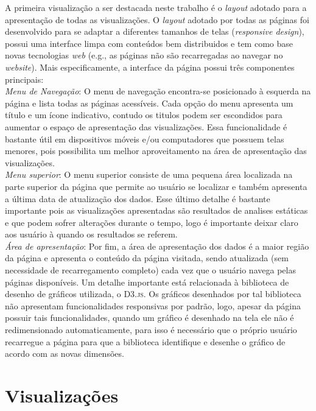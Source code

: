 \documentclass[12pt]{article}
\begin{document}
A primeira visualização a ser destacada neste trabalho é o \textit{layout} adotado para a apresentação de todas as visualizações. O \textit{layout} adotado por todas as páginas foi desenvolvido para se adaptar a diferentes tamanhos de telas (\textit{responsive design}), possui uma interface limpa com conteúdos bem distribuidos e tem como base novas tecnologias \textit{web} (e.g., as páginas não são recarregadas ao navegar no \textit{website}). Mais especificamente, a interface da página possui três componentes principais: \\


\noindent \emph{Menu de Navegação}: O menu de navegação encontra-se posicionado à esquerda na página e lista todas as páginas acessíveis. Cada opção do menu apresenta um título e um ícone indicativo, contudo os titulos podem ser escondidos para aumentar o espaço de apresentação das visualizações. Essa funcionalidade é bastante útil em dispositivos móveis e/ou computadores que possuem telas menores, pois possibilita um melhor aproveitamento na área de apresentação das visualizações. \\

\noindent \emph{Menu superior}: O menu superior consiste de uma pequena área localizada na parte superior da página que permite ao usuário se localizar e também apresenta a última data de atualização dos dados. Esse último detalhe é bastante importante pois as visualizações apresentadas são resultados de analises estáticas e que podem sofrer alterações durante o tempo, logo é importante deixar claro aos usuário à quando os resultados se referem. \\

\noindent \emph{Área de apresentação}: Por fim, a área de apresentação dos dados é a maior região da página e apresenta o conteúdo da página visitada, sendo atualizada (sem necessidade de recarregamento completo) cada vez que o usuário navega pelas páginas disponíveis. Um detalhe importante está relacionada à biblioteca de desenho de gráficos utilizada, o \textsc{D3.js}. Os gráficos desenhados por tal biblioteca não apresentam funcionalidades responsivas por padrão, logo, apesar da página possuir tais funcionalidades, quando um gráfico é desenhado na tela ele não é redimensionado automaticamente, para isso é necessário que o próprio usuário recarregue a página para que a biblioteca identifique e desenhe o gráfico de acordo com as novas dimensões. \\

\section{Visualizações}
\end{document}
